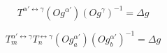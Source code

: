 $$T^{\alpha'\leftrightarrow\gamma}\left(Og^{\alpha'}\right)\left(Og^{\gamma}\right)^{-1} = \Delta g \label{eq:1}$$

$$T_{m}^{\alpha'\leftrightarrow\gamma}T_{n}^{\leftrightarrow\gamma}\left(Og_{a}^{\alpha'}\right)\left(Og_{b}^{\alpha'}\right)^{-1} = \Delta g \label{eq:2}$$
